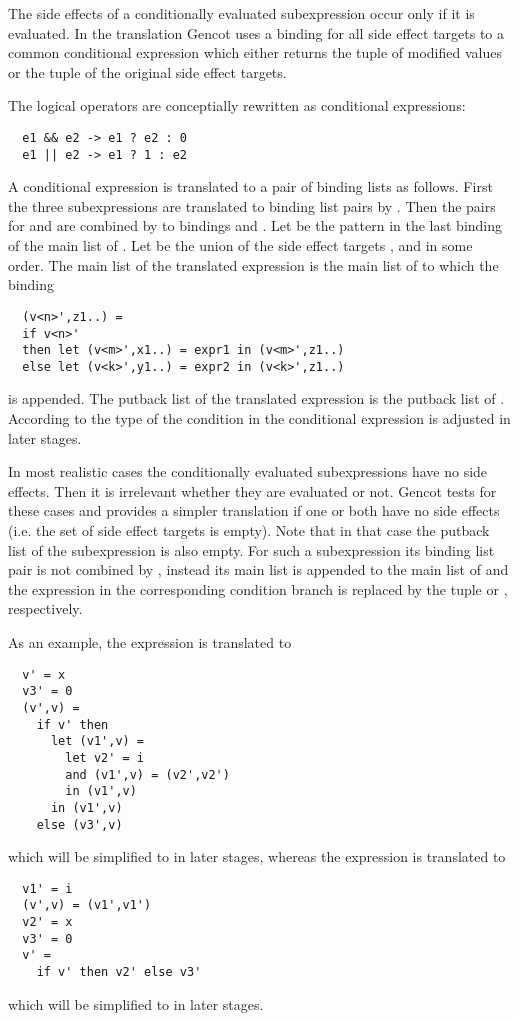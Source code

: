 The side effects of a conditionally evaluated subexpression occur only if it is evaluated. In the translation Gencot uses a binding for 
all side effect targets to a common conditional expression which either returns the tuple of modified values or the tuple of the original 
side effect targets. 

The logical operators are conceptially rewritten as conditional expressions:
\begin{verbatim}
  e1 && e2 -> e1 ? e2 : 0
  e1 || e2 -> e1 ? 1 : e2
\end{verbatim}

A conditional expression  is translated to a pair of binding lists as follows. First the three subexpressions are translated
to binding list pairs by . Then the pairs for  and  are combined by  to bindings 
 and . Let  be the pattern in the last binding of the main list 
of . Let  be the union of the side effect targets , and  in some order. The main list 
of the translated expression is the main list of  to which the binding 
\begin{verbatim}
  (v<n>',z1..) = 
  if v<n>' 
  then let (v<m>',x1..) = expr1 in (v<m>',z1..)
  else let (v<k>',y1..) = expr2 in (v<k>',z1..)
\end{verbatim}
is appended. The putback list of the translated expression is the putback list of . According to the type of  the
condition in the conditional expression is adjusted in later stages.

In most realistic cases the conditionally evaluated subexpressions have no side effects. Then it is irrelevant whether they are 
evaluated or not. Gencot tests for these cases and provides a simpler translation if one or both have no side effects (i.e. the set 
of side effect targets is empty). Note that in that case the putback list of the subexpression is also empty. For such a subexpression
its binding list pair is not combined by , instead its main list is appended to the main list of  and the 
expression in the corresponding condition branch is replaced by the tuple  or , respectively.

As an example, the expression  is translated to
\begin{verbatim}
  v' = x
  v3' = 0
  (v',v) = 
    if v' then 
      let (v1',v) = 
        let v2' = i 
        and (v1',v) = (v2',v2') 
        in (v1',v) 
      in (v1',v)
    else (v3',v)
\end{verbatim}
which will be simplified to  in later stages,
whereas the expression  is translated to
\begin{verbatim}
  v1' = i
  (v',v) = (v1',v1')
  v2' = x
  v3' = 0
  v' = 
    if v' then v2' else v3'
\end{verbatim}
which will be simplified to  in later stages.

